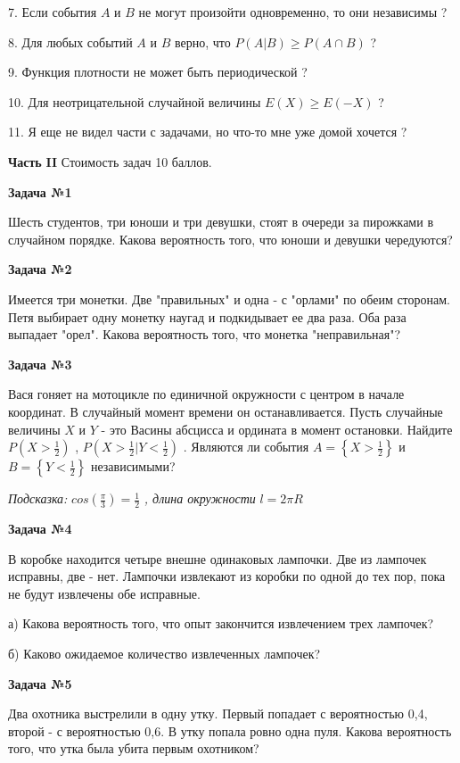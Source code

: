 \documentclass[pdftex,12pt,a4paper]{article}
\begin{document}
7. Если события  $A$  и  $B$  не могут произойти одновременно, то они независимы ?

8. Для любых событий  $A$  и  $B$  верно, что  $P\left(A|B\right)\ge P\left(A\cap B\right)$  ?

9. Функция плотности не может быть периодической ?

10. Для неотрицательной случайной величины  $E\left(X\right)\ge E\left(-X\right)$  ?

11. Я еще не видел части с задачами, но что-то мне уже домой хочется ?





\pagebreak 

{\bf Часть }{\bf II} Стоимость задач 10 баллов.

{\bf Задача №1}

Шесть студентов, три юноши и три девушки, стоят в очереди за пирожками в случайном порядке. Какова вероятность того, что юноши и девушки чередуются?

{\bf Задача №2}

Имеется три монетки. Две "правильных" и одна - с "орлами" по обеим сторонам. Петя выбирает одну монетку наугад и подкидывает ее два раза. Оба раза выпадает "орел". Какова вероятность того, что монетка "неправильная"?

{\bf Задача №3}

Вася гоняет на мотоцикле по единичной окружности с центром в начале координат. В случайный момент времени он останавливается. Пусть случайные величины  $X$  и  $Y$  - это Васины абсцисса и ордината в момент остановки. Найдите  $P\left(X>\frac{1}{2} \right)$ ,  $P\left(X>\frac{1}{2} |Y<\frac{1}{2} \right)$ . Являются ли события  $A=\left\{X>\frac{1}{2} \right\}$  и  $B=\left\{Y<\frac{1}{2} \right\}$  независимыми?

{\it Подсказка: } $cos\left(\frac{\pi }{3} \right)=\frac{1}{2} $ {\it , длина окружности } $l=2\pi R$ 

{\bf Задача №4}

В коробке находится четыре внешне одинаковых лампочки. Две из лампочек исправны, две - нет. Лампочки извлекают из коробки по одной до тех пор, пока не будут извлечены обе исправные.

а)	Какова вероятность того, что опыт закончится извлечением трех лампочек?

б)	Каково ожидаемое количество извлеченных лампочек?

{\bf Задача №5}

Два охотника выстрелили в одну утку. Первый попадает с вероятностью 0,4, второй - с вероятностью 0,6. В утку попала ровно одна пуля. Какова вероятность того, что утка была убита первым охотником?
\end{document}
